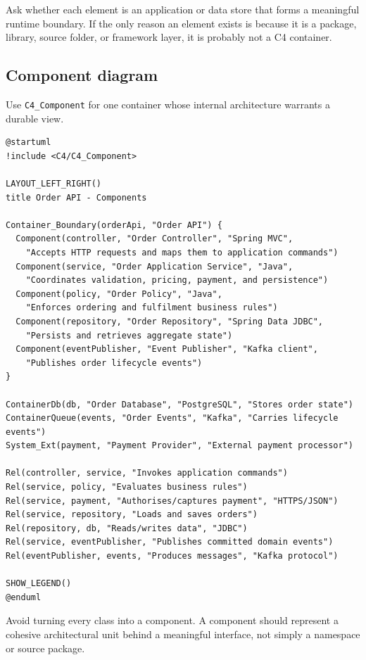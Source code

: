 \documentclass[11pt]{article}
\newcommand{\code}[1]{\texttt{#1}}
\begin{document}
\begin{keybox}
Ask whether each element is an application or data store that forms a meaningful runtime boundary. If the only reason an element exists is because it is a package, library, source folder, or framework layer, it is probably not a C4 container.
\end{keybox}

\subsection{Component diagram}

Use \code{C4\_Component} for one container whose internal architecture warrants a durable view.

\begin{lstlisting}[language=PlantUML]
@startuml
!include <C4/C4_Component>

LAYOUT_LEFT_RIGHT()
title Order API - Components

Container_Boundary(orderApi, "Order API") {
  Component(controller, "Order Controller", "Spring MVC",
    "Accepts HTTP requests and maps them to application commands")
  Component(service, "Order Application Service", "Java",
    "Coordinates validation, pricing, payment, and persistence")
  Component(policy, "Order Policy", "Java",
    "Enforces ordering and fulfilment business rules")
  Component(repository, "Order Repository", "Spring Data JDBC",
    "Persists and retrieves aggregate state")
  Component(eventPublisher, "Event Publisher", "Kafka client",
    "Publishes order lifecycle events")
}

ContainerDb(db, "Order Database", "PostgreSQL", "Stores order state")
ContainerQueue(events, "Order Events", "Kafka", "Carries lifecycle events")
System_Ext(payment, "Payment Provider", "External payment processor")

Rel(controller, service, "Invokes application commands")
Rel(service, policy, "Evaluates business rules")
Rel(service, payment, "Authorises/captures payment", "HTTPS/JSON")
Rel(service, repository, "Loads and saves orders")
Rel(repository, db, "Reads/writes data", "JDBC")
Rel(service, eventPublisher, "Publishes committed domain events")
Rel(eventPublisher, events, "Produces messages", "Kafka protocol")

SHOW_LEGEND()
@enduml
\end{lstlisting}

Avoid turning every class into a component. A component should represent a cohesive architectural unit behind a meaningful interface, not simply a namespace or source package.\cite{c4componentabs}
\end{document}

